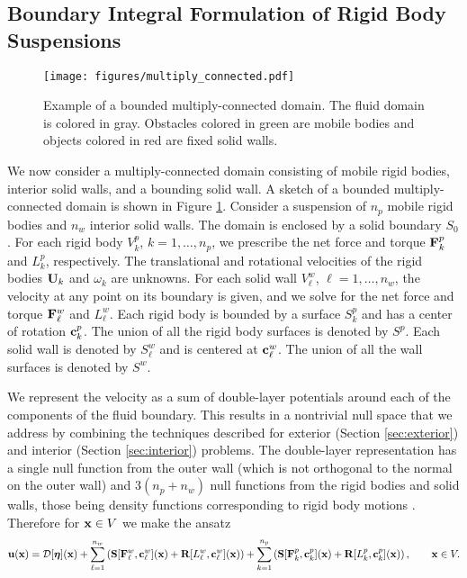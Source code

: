 \subsection{Boundary Integral Formulation of  Rigid Body Suspensions}

\begin{figure}[!h]
\begin{center}
	\texttt{[image: figures/multiply\_connected.pdf]}
\caption[Sketch of a multiply connected domain]{Example of a bounded multiply-connected domain. The fluid domain is colored in gray. Obstacles colored in green are mobile bodies and objects colored in red are fixed solid walls.}\label{fig:multiply_connected}
\end{center}
\end{figure}

We now consider a multiply-connected domain consisting of mobile rigid bodies, interior solid walls, and a bounding solid wall.  A sketch of a bounded multiply-connected domain is shown in Figure \ref{fig:multiply_connected}.  Consider a suspension of $n_p$ mobile rigid bodies and $n_w$ interior solid walls. The domain is enclosed by a solid boundary $S_0$.  For each rigid body $V^p_k$, $k=1,\hdots, n_p$, we prescribe the net force and torque ${\mathbf{F}}^p_k$ and $L^p_k$, respectively. The translational and rotational velocities of the rigid bodies ${\mathbf{U}}_k$ and $\omega_k$ are unknowns. For each solid wall $V^w_\ell$, $\ell=1,\hdots,n_w$, the velocity at any point on its boundary is given, and we solve for the net force and torque ${\mathbf{F}}^w_\ell$ and $L^w_\ell$. Each rigid body is bounded by a surface $S^p_k$ and has a center of rotation ${\mathbf{c}}^p_k$. The union of all the rigid body surfaces is denoted by $S^p$. Each solid wall is denoted by $S^w_\ell$ and is centered at ${\mathbf{c}}^w_\ell$. The union of all the wall surfaces is denoted by $S^w$. 

We represent the velocity as a sum of double-layer potentials around each of the components of the fluid boundary. This results in a nontrivial null space that we address by combining the techniques described for exterior (Section \ref{sec:exterior}) and interior (Section \ref{sec:interior}) problems. The double-layer representation has a single null function from the outer wall (which is not orthogonal to the normal on the outer wall) and $3(n_p+n_w)$ null functions from the rigid bodies and solid walls, those being density functions corresponding to rigid body motions \cite{Ladyzhenskaya1963, Karrila1989, Karrila1991, Power1987}. Therefore for ${\mathbf{x}}\in V$ we make the ansatz
\[ {\mathbf{u}}({\mathbf{x}}) = \mathcal{D}[\bm{\eta}]({\mathbf{x}}) +  \sum\limits_{\ell=1}^{n_w} \left({\mathbf{S}}[{\mathbf{F}}^w_\ell,{\mathbf{c}}^w_\ell]({\mathbf{x}}) + {\mathbf{R}}[L^w_\ell,{\mathbf{c}}^w_\ell]({\mathbf{x}})\right)  +  \sum\limits_{k=1}^{n_p} \left({\mathbf{S}}[{\mathbf{F}}^p_k,{\mathbf{c}}^p_k]({\mathbf{x}}) + {\mathbf{R}}[L^p_k,{\mathbf{c}}^p_k]({\mathbf{x}})\right),\qquad {\mathbf{x}}\in V.\]

